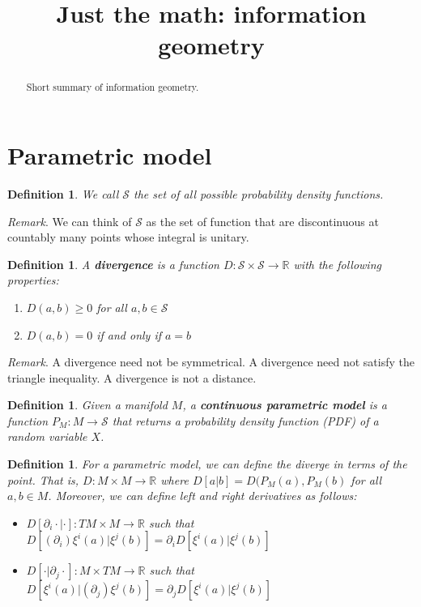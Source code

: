 \documentclass{article}
\title{Just the math: information geometry}
\date{\vspace{-5ex}}
\newtheorem{defn}[equation]{Definition}
\newenvironment{remark}{\emph{Remark}.}{}
\begin{document}
\maketitle


\begin{abstract}
Short summary of information geometry.
\end{abstract}

\section{Parametric model}

\begin{defn}
	We call $\mathcal{S}$ the set of all possible probability density functions.
\end{defn}

\begin{remark}
	We can think of $\mathcal{S}$ as the set of function that are discontinuous at countably many points whose integral is unitary.
\end{remark}

\begin{defn}
	A \textbf{divergence} is a function $D : \mathcal{S} \times \mathcal{S} \to \mathbb{R}$ with the following properties:
	\begin{enumerate}
		\item $D(a, b) \geq 0$ for all $a,b \in \mathcal{S}$
		\item $D(a, b) = 0$ if and only if $a=b$
	\end{enumerate}
\end{defn}

\begin{remark}
	A divergence need not be symmetrical. A divergence need not satisfy the triangle inequality. A divergence is not a distance.
\end{remark}

\begin{defn}
	Given a manifold $M$, a \textbf{continuous parametric model} is a function $P_M : M \to \mathcal{S}$ that returns a probability density function (PDF) of a random variable $X$.
\end{defn}

\begin{defn}
	For a parametric model, we can define the diverge in terms of the point. That is, $D : M \times M \to \mathbb{R}$ where $D[a | b] = D(P_M(a), P_M(b)$ for all $a,b \in M$. Moreover, we can define left and right derivatives as follows:
	\begin{itemize}
		\item $D[\partial_i \cdot | \cdot] : TM \times M \to \mathbb{R}$ such that $D[ (\partial_i) \xi^i(a) | \xi^j(b)] = \partial_i D[\xi^i(a) | \xi^j(b)]$
		\item $D[\cdot | \partial_j \cdot] : M \times TM \to \mathbb{R}$ such that $D[ \xi^i(a) | (\partial_j) \xi^j(b)] = \partial_j D[\xi^i(a) | \xi^j(b)]$
	\end{itemize} 
\end{defn}

%
%
\end{document}
